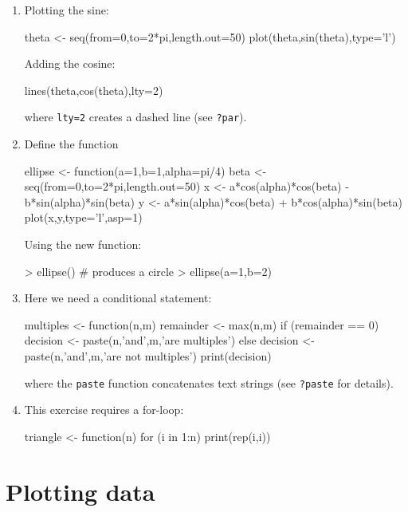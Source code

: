 \begin{enumerate}
\item Plotting the sine:

\begin{script}
theta <- seq(from=0,to=2*pi,length.out=50)
plot(theta,sin(theta),type='l')
\end{script}

Adding the cosine:

\begin{script}[firstnumber=3]
lines(theta,cos(theta),lty=2)
\end{script}

\noindent where \texttt{lty=2} creates a dashed line (see
\texttt{?par}).

\item Define the function

\begin{script}
ellipse <- function(a=1,b=1,alpha=pi/4){
  beta <- seq(from=0,to=2*pi,length.out=50)
  x <- a*cos(alpha)*cos(beta) - b*sin(alpha)*sin(beta)
  y <- a*sin(alpha)*cos(beta) + b*cos(alpha)*sin(beta)
  plot(x,y,type='l',asp=1)
}
\end{script}

Using the new function:

\begin{console}
> ellipse() # produces a circle
> ellipse(a=1,b=2)
\end{console}
    
\item Here we need a conditional statement:

\begin{script}
multiples <- function(n,m){
  remainder <- max(n,m) %
  if (remainder == 0){
    decision <- paste(n,'and',m,'are multiples')
  } else {
    decision <- paste(n,'and',m,'are not multiples')
  }
  print(decision)
}
\end{script}

\noindent where the \texttt{paste} function concatenates text strings
(see \texttt{?paste} for details).

\item This exercise requires a for-loop:
  
\begin{script}
triangle <- function(n){
  for (i in 1:n){
    print(rep(i,i))
  }
}
\end{script}
  
\end{enumerate}

\section{Plotting data}
\label{sec:sol-plotting}

